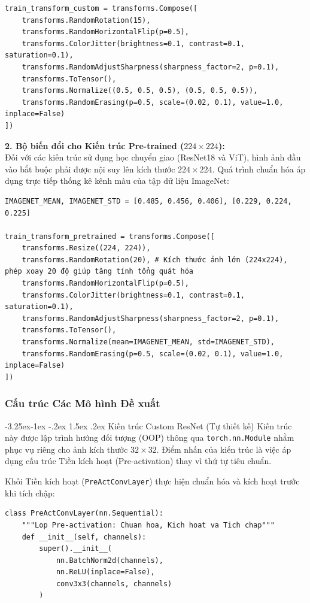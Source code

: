 \documentclass[a4paper]{article}
\makeatletter
\theoremstyle{definition}
\newcounter {subsubsubsection}[subsubsection]
\newcommand\subsubsubsection{\@startsection{subsubsubsection}{4}{\z@}%
                                     {-3.25ex\@plus -1ex \@minus -.2ex}%
                                     {1.5ex \@plus .2ex}%
                                     {\normalfont\normalsize\bfseries}}
\makeatother
\begin{document}
\begin{verbatim}
train_transform_custom = transforms.Compose([
    transforms.RandomRotation(15),
    transforms.RandomHorizontalFlip(p=0.5),
    transforms.ColorJitter(brightness=0.1, contrast=0.1, saturation=0.1),
    transforms.RandomAdjustSharpness(sharpness_factor=2, p=0.1),
    transforms.ToTensor(),
    transforms.Normalize((0.5, 0.5, 0.5), (0.5, 0.5, 0.5)),
    transforms.RandomErasing(p=0.5, scale=(0.02, 0.1), value=1.0, inplace=False)
])
\end{verbatim}

\textbf{2. Bộ biến đổi cho Kiến trúc Pre-trained ($224 \times 224$):}\\
Đối với các kiến trúc sử dụng học chuyển giao (ResNet18 và ViT), hình ảnh đầu vào bắt buộc phải được nội suy lên kích thước $224 \times 224$. Quá trình chuẩn hóa áp dụng trực tiếp thống kê kênh màu của tập dữ liệu ImageNet:

\begin{verbatim}
IMAGENET_MEAN, IMAGENET_STD = [0.485, 0.456, 0.406], [0.229, 0.224, 0.225]

train_transform_pretrained = transforms.Compose([
    transforms.Resize((224, 224)),
    transforms.RandomRotation(20), # Kích thước ảnh lớn (224x224), phép xoay 20 độ giúp tăng tính tổng quát hóa
    transforms.RandomHorizontalFlip(p=0.5),
    transforms.ColorJitter(brightness=0.1, contrast=0.1, saturation=0.1),
    transforms.RandomAdjustSharpness(sharpness_factor=2, p=0.1),
    transforms.ToTensor(),
    transforms.Normalize(mean=IMAGENET_MEAN, std=IMAGENET_STD),
    transforms.RandomErasing(p=0.5, scale=(0.02, 0.1), value=1.0, inplace=False)
])
\end{verbatim}

\subsubsection{Cấu trúc Các Mô hình Đề xuất}

\subsubsubsection{Kiến trúc Custom ResNet (Tự thiết kế)}
Kiến trúc này được lập trình hướng đối tượng (OOP) thông qua \texttt{torch.nn.Module} nhằm phục vụ riêng cho ảnh kích thước $32 \times 32$. Điểm nhấn của kiến trúc là việc áp dụng cấu trúc Tiền kích hoạt (Pre-activation) thay vì thứ tự tiêu chuẩn.

Khối Tiền kích hoạt (\texttt{PreActConvLayer}) thực hiện chuẩn hóa và kích hoạt trước khi tích chập:
\begin{verbatim}
class PreActConvLayer(nn.Sequential):
    """Lop Pre-activation: Chuan hoa, Kich hoat va Tich chap"""
    def __init__(self, channels):
        super().__init__(
            nn.BatchNorm2d(channels),
            nn.ReLU(inplace=False),
            conv3x3(channels, channels)
        )
\end{verbatim}
\end{document}

